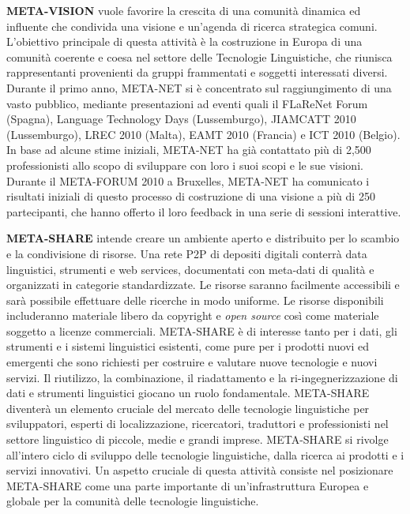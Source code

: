 \documentclass[]{../../metanetpaper}
\begin{document}
\begin{multicols}{2}
\textbf{META-VISION} vuole favorire la crescita di una comunit\`{a} dinamica ed influente che condivida una visione e un'agenda di ricerca strategica comuni. L'obiettivo principale di questa attivit\`{a} \`{e} la costruzione in Europa di una comunit\`{a} coerente e coesa nel settore delle Tecnologie Linguistiche, che riunisca rappresentanti provenienti da gruppi frammentati e soggetti interessati diversi. Durante il primo anno, META-NET si \`{e} concentrato sul raggiungimento di una vasto pubblico, mediante presentazioni ad eventi quali il FLaReNet Forum (Spagna), Language Technology Days (Lussemburgo), JIAMCATT 2010 (Lussemburgo), LREC 2010 (Malta), EAMT 2010 (Francia) e ICT 2010 (Belgio). In base ad alcune stime iniziali, META-NET ha gi\`{a} contattato pi\`{u} di 2,500 professionisti allo scopo di sviluppare con loro i suoi scopi e le sue visioni. Durante il META-FORUM 2010 a Bruxelles, META-NET ha comunicato i risultati iniziali di questo processo di costruzione di una visione a pi\`{u} di 250 partecipanti, che hanno offerto il loro feedback in una serie di sessioni interattive.



\textbf{META-SHARE} intende creare un ambiente aperto e distribuito per lo scambio e la condivisione di risorse. Una rete P2P di depositi digitali conterr\`{a} data linguistici, strumenti e web services, documentati con meta-dati di qualit\`{a} e organizzati in categorie standardizzate. Le risorse saranno facilmente accessibili e sar\`{a} possibile effettuare delle ricerche in modo uniforme. Le risorse disponibili includeranno materiale libero da copyright e \emph{open source}  cos\`{i} come materiale soggetto a licenze commerciali. META-SHARE \`{e} di interesse tanto per i dati, gli strumenti e i sistemi linguistici esistenti, come pure per i prodotti nuovi ed emergenti che sono richiesti per costruire e valutare nuove tecnologie e nuovi servizi. Il riutilizzo, la combinazione, il riadattamento e la ri-ingegnerizzazione di dati e strumenti linguistici giocano un ruolo fondamentale. META-SHARE diventer\`{a} un elemento cruciale del mercato delle tecnologie linguistiche per sviluppatori, esperti di localizzazione, ricercatori, traduttori e professionisti nel settore linguistico di piccole, medie e grandi imprese. META-SHARE si rivolge all'intero ciclo di sviluppo delle tecnologie linguistiche, dalla ricerca ai prodotti e i servizi innovativi. Un aspetto cruciale di questa attivit\`{a} consiste nel posizionare META-SHARE come una parte importante di un'infrastruttura Europea e globale per la comunit\`{a} delle tecnologie linguistiche.


\end{multicols}
\end{document}
